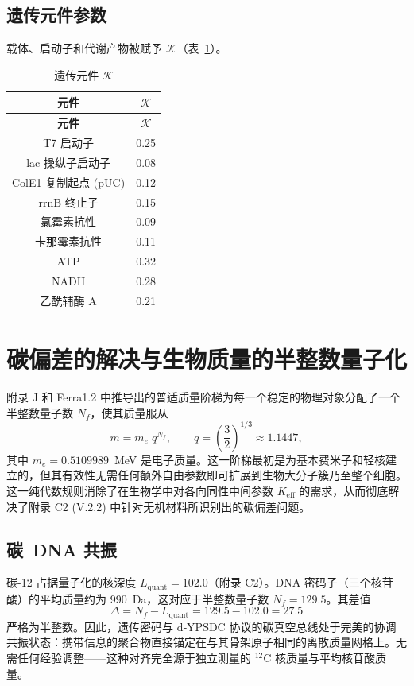 \documentclass[12pt,a4paper]{article}
\newcommand{\REL}{\mathcal{K}}          %
\begin{document}
	\subsection{遗传元件参数}
	载体、启动子和代谢产物被赋予 \(\REL\)（表~\ref{tab:elements}）。
	
	\begin{longtable}{|c|c|}
		\caption{遗传元件 \(\REL\)}\label{tab:elements}\\
		\hline
		\textbf{元件} & \(\REL\) \\
		\hline
		\endfirsthead
		\hline
		\textbf{元件} & \(\REL\) \\
		\hline
		\endhead
		\hline
		T7 启动子 & 0.25 \\
		lac 操纵子启动子 & 0.08 \\
		ColE1 复制起点 (pUC) & 0.12 \\
		rrnB 终止子 & 0.15 \\
		氯霉素抗性 & 0.09 \\
		卡那霉素抗性 & 0.11 \\
		ATP & 0.32 \\
		NADH & 0.28 \\
		乙酰辅酶 A & 0.21 \\
		\hline
	\end{longtable}
	
	\section{碳偏差的解决与生物质量的半整数量子化}
	\label{sec:quantization}
	
	附录 J 和 Ferra1.2 中推导出的普适质量阶梯为每一个稳定的物理对象分配了一个半整数量子数 \(N_f\)，使其质量服从
	\begin{equation}
		m = m_e \; q^{N_f}, \qquad q = \left(\frac{3}{2}\right)^{1/3} \approx 1.1447,
		\label{eq:mass_ladder}
	\end{equation}
	其中 \(m_e = 0.5109989\)~MeV 是电子质量。这一阶梯最初是为基本费米子和轻核建立的，但其有效性无需任何额外自由参数即可扩展到生物大分子簇乃至整个细胞。这一纯代数规则消除了在生物学中对各向同性中间参数 \(K_{\mathrm{eff}}\) 的需求，从而彻底解决了附录 C2 (V.2.2) 中针对无机材料所识别出的碳偏差问题。
	
	\subsection{碳–DNA 共振}
	碳-12 占据量子化的核深度 \(L_{\mathrm{quant}} = 102.0\)（附录 C2）。DNA 密码子（三个核苷酸）的平均质量约为 990~Da，这对应于半整数量子数 \(N_f = 129.5\)。其差值
	\[
	\Delta = N_f - L_{\mathrm{quant}} = 129.5 - 102.0 = 27.5
	\]
	严格为半整数。因此，遗传密码与 d‑YPSDC 协议的碳真空总线处于完美的协调共振状态：携带信息的聚合物直接锚定在与其骨架原子相同的离散质量网格上。无需任何经验调整——这种对齐完全源于独立测量的 \(^{12}\mathrm{C}\) 核质量与平均核苷酸质量。
	
\end{document}
